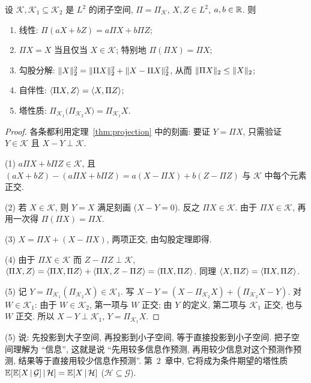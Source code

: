 \begin{proposition}[投影算子的性质]\label{prop:projection-properties}
设 $\mathcal{K},\mathcal{K}_1\subseteq\mathcal{K}_2$ 是 $L^2$ 的闭子空间, $\Pi=\Pi_{\mathcal{K}}$, $X,Z\in L^2$, $a,b\in\mathbb{R}$. 则
\begin{enumerate}
\item 线性: $\Pi(aX+bZ)=a\Pi X+b\Pi Z$;
\item $\Pi X=X$ 当且仅当 $X\in\mathcal{K}$; 特别地 $\Pi(\Pi X)=\Pi X$;
\item 勾股分解: $\lVert X\rVert_2^2=\lVert\Pi X\rVert_2^2+\lVert X-\Pi X\rVert_2^2$, 从而 $\lVert\Pi X\rVert_2\le\lVert X\rVert_2$;
\item 自伴性: $\langle\Pi X,Z\rangle=\langle X,\Pi Z\rangle$;
\item 塔性质: $\Pi_{\mathcal{K}_1}\big(\Pi_{\mathcal{K}_2}X\big)=\Pi_{\mathcal{K}_1}X$.
\end{enumerate}
\end{proposition}

\begin{proof}
各条都利用定理~\ref{thm:projection} 中的刻画: 要证 $Y=\Pi X$, 只需验证 $Y\in\mathcal{K}$ 且 $X-Y\perp\mathcal{K}$.

(1) $a\Pi X+b\Pi Z\in\mathcal{K}$, 且 $(aX+bZ)-(a\Pi X+b\Pi Z)=a(X-\Pi X)+b(Z-\Pi Z)$ 与 $\mathcal{K}$ 中每个元素正交.

(2) 若 $X\in\mathcal{K}$, 则 $Y=X$ 满足刻画 ($X-Y=0$). 反之 $\Pi X\in\mathcal{K}$. 由于 $\Pi X\in\mathcal{K}$, 再用一次得 $\Pi(\Pi X)=\Pi X$.

(3) $X=\Pi X+(X-\Pi X)$, 两项正交, 由勾股定理即得.

(4) 由于 $\Pi X\in\mathcal{K}$ 而 $Z-\Pi Z\perp\mathcal{K}$, $\langle\Pi X,Z\rangle=\langle\Pi X,\Pi Z\rangle+\langle\Pi X,Z-\Pi Z\rangle=\langle\Pi X,\Pi Z\rangle$. 同理 $\langle X,\Pi Z\rangle=\langle\Pi X,\Pi Z\rangle$.

(5) 记 $Y=\Pi_{\mathcal{K}_1}(\Pi_{\mathcal{K}_2}X)\in\mathcal{K}_1$. 写
$X-Y=(X-\Pi_{\mathcal{K}_2}X)+(\Pi_{\mathcal{K}_2}X-Y)$. 对 $W\in\mathcal{K}_1$: 由于 $W\in\mathcal{K}_2$, 第一项与 $W$ 正交; 由 $Y$ 的定义, 第二项与 $\mathcal{K}_1$ 正交, 也与 $W$ 正交. 所以 $X-Y\perp\mathcal{K}_1$, $Y=\Pi_{\mathcal{K}_1}X$.
\end{proof}

\begin{intuition}
(5) 说: 先投影到大子空间, 再投影到小子空间, 等于直接投影到小子空间. 把子空间理解为 ``信息'', 这就是说 ``先用较多信息作预测, 再用较少信息对这个预测作预测, 结果等于直接用较少信息作预测''. 第~2~章中, 它将成为条件期望的塔性质 $\mathbb{E}[\mathbb{E}[X\,|\,\mathcal{G}]\,|\,\mathcal{H}]=\mathbb{E}[X\,|\,\mathcal{H}]$ ($\mathcal{H}\subseteq\mathcal{G}$).
\end{intuition}

